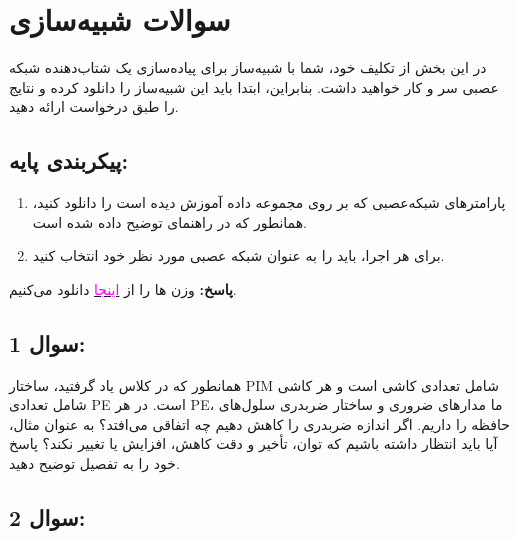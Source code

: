 \documentclass[12pt]{exam}
\begin{document}
\begin{questions}
\begin{enumerate}
\end{enumerate}


		
		
		
		
		
		
	\section*{سوالات شبیه‌سازی}
	\question
	
	
در این بخش از تکلیف خود، شما با شبیه‌ساز  برای پیاده‌سازی یک شتاب‌دهنده شبکه عصبی سر و کار خواهید داشت. بنابراین، ابتدا باید این شبیه‌ساز را دانلود کرده و نتایج را طبق درخواست ارائه دهید.
	
	\subsection*{پیکربندی پایه:}
	\begin{enumerate}
		\item پارامتر‌های شبکه‌عصبی  که بر روی مجموعه داده  آموزش دیده است را دانلود کنید، همانطور که در راهنمای  توضیح داده شده است.
		\item برای هر اجرا، باید  را به عنوان شبکه عصبی مورد نظر خود انتخاب کنید.
	\end{enumerate}
	
	\textbf{پاسخ:} وزن ها را از \href{https://onedrive.live.com/?authkey=%21ANiQIk04073Gdfo&id=8F6F3FD340AC68D1%21332&cid=8F6F3FD340AC68D1}{\textcolor{magenta}{اینجا}}
	دانلود می‌کنیم.
	
	\subsection*{سوال 1:}
	
	همانطور که در کلاس یاد گرفتید، ساختار PIM شامل تعدادی کاشی است و هر کاشی شامل تعدادی PE است. در هر PE، ما مدارهای ضروری و ساختار ضربدری سلول‌های حافظه را داریم. اگر اندازه ضربدری را کاهش دهیم چه اتفاقی می‌افتد؟ به عنوان مثال، آیا باید انتظار داشته باشیم که توان، تأخیر و دقت کاهش، افزایش یا تغییر نکند؟ پاسخ خود را به تفصیل توضیح دهید.
	
	\subsection*{سوال 2:}
	

\end{questions}
\end{document}
